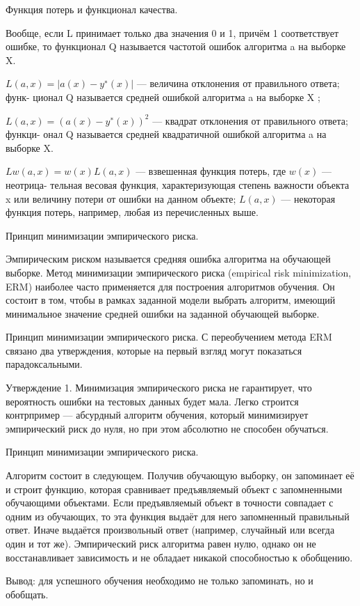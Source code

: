 \documentclass{beamer}
\begin{document}
\begin{frame}{Функция потерь и функционал качества.}

Вообще, если L принимает только два значения 0 и 1, причём 1 соответствует ошибке,
 то функционал Q называется частотой ошибок алгоритма a на выборке X.

$L (a, x) = |a(x) − y^∗ (x)|$ — величина отклонения от правильного ответа; функ-
ционал Q называется средней ошибкой алгоритма a на выборке X ;

$L (a, x) = (a(x)−y^∗ (x))^2$ — квадрат отклонения от правильного ответа; функци-
онал Q называется средней квадратичной ошибкой алгоритма a на выборке X.

$L w (a, x) = w(x)L (a, x)$ — взвешенная функция потерь, где $w(x)$ — неотрица-
тельная весовая функция, характеризующая степень важности объекта x или
величину потери от ошибки на данном объекте; $L (a, x)$ — некоторая функция
потерь, например, любая из перечисленных выше.


\end{frame}




 
\begin{frame}{Принцип минимизации эмпирического риска.}

Эмпирическим риском называется средняя ошибка алгоритма на обучающей выборке. Метод минимизации эмпирического риска (empirical risk minimization, ERM) наиболее часто применяется для построения алгоритмов обучения. Он состоит в том, чтобы в рамках заданной модели выбрать алгоритм, имеющий минимальное значение средней ошибки на заданной обучающей выборке.

\end{frame}

\begin{frame}{Принцип минимизации эмпирического риска.}
С переобучением метода ERM связано два утверждения, которые на первый взгляд могут показаться парадоксальными.

Утверждение 1. Минимизация эмпирического риска не гарантирует, что вероятность ошибки на тестовых данных будет мала. Легко строится контрпример — абсурдный алгоритм обучения, который минимизирует эмпирический риск до нуля, но при этом абсолютно не способен обучаться. 

\end{frame}

\begin{frame}{Принцип минимизации эмпирического риска.}

Алгоритм состоит в следующем. Получив обучающую выборку, он запоминает её и строит функцию,
 которая сравнивает предъявляемый объект с запомненными обучающими объектами. 
 Если предъявляемый объект в точности совпадает с одним из обучающих, то эта функция 
 выдаёт для него запомненный правильный ответ. Иначе выдаётся произвольный ответ (например, случайный или всегда один и тот же). 
 Эмпирический риск алгоритма равен нулю, однако он не восстанавливает зависимость и не обладает никакой способностью к обобщению.

Вывод: для успешного обучения необходимо не только запоминать, но и обобщать.

\end{frame}
\end{document}
